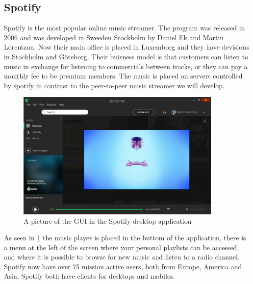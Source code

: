 \subsection{Spotify}
Spotify is the most popular online music streamer. The program was released in 2006 and was developed in Sweeden Stockholm by Daniel Ek and Martin Lorentzon. Now their main office is placed in Luxemborg and they have devisions in Stockholm and Göteborg. Their buisness model is that customers can listen to music in exchange for listening to commercials between tracks, or they can pay a monthly fee to be premium members.
The music is placed on servers controlled by spotify in contrast to the peer-to-peer music streamer we will develop.
\begin{figure}[h]
  \centering
    \includegraphics[width=0.9\textwidth]{gfx/Spotify_desktop.jpg}
  \caption{A picture of the \acs{GUI} in the Spotify desktop application}
  \label{fig:spotify}
\end{figure}
As seen in \ref{fig:spotify} the music player is placed in the buttom of the application, there is a menu at the left of the screen where your personal playlists can be accessed, and where it is possible to browse for new music and listen to a radio channel.
Spotify now have over 75 mission active users, both from Europe, America and Asia. Spotify both have clients for desktops and mobiles.

